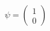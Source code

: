 \documentclass[preview]{standalone}
\begin{document}
\begin{align*}
\psi = \begin{pmatrix} 1 \\ 0 \end{pmatrix}
\end{align*}
\end{document}
